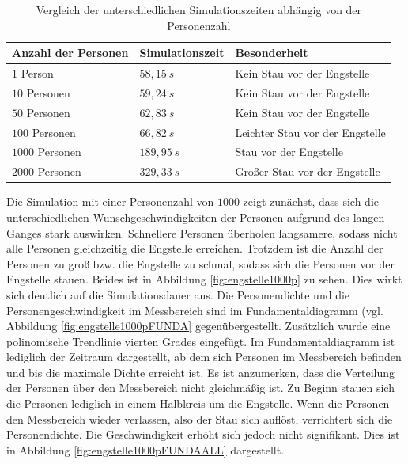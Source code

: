 \begin{table}[htpb]
	\centering
	\begin{tabular}{lll}
		Anzahl der Personen & Simulationszeit  &  Besonderheit\\ \hline
		$1$ Person & $58,15\ s$  &  Kein Stau vor der Engstelle\\ 
		$10$ Personen & $59,24\ s$  &  Kein Stau vor der Engstelle\\ 
		$50$ Personen & $62,83\ s$  &  Kein Stau vor der Engstelle\\ 
		$100$ Personen & $66,82\ s$  &  Leichter Stau vor der Engstelle\\ 
		$1000$ Personen & $189,95\ s$  &  Stau vor der Engstelle\\ 
		$2000$ Personen & $329,33\ s$  &  Großer Stau vor der Engstelle\\ 
 
	\end{tabular}
	\caption{Vergleich der unterschiedlichen Simulationszeiten abhängig von der Personenzahl}
	\label{tab:SimuZeitEngstelle}
\end{table}

Die Simulation mit einer Personenzahl von $1000$ zeigt zunächst, dass sich die unterschiedlichen Wunschgeschwindigkeiten der Personen aufgrund des langen Ganges stark auswirken. Schnellere Personen überholen langsamere, sodass nicht alle Personen gleichzeitig die Engstelle erreichen. Trotzdem ist die Anzahl der Personen zu groß bzw. die Engstelle zu schmal, sodass sich die Personen vor der Engstelle stauen. Beides ist in Abbildung \ref{fig:engstelle1000p} zu sehen. Dies wirkt sich deutlich auf die Simulationsdauer aus. Die Personendichte und die Personengeschwindigkeit im Messbereich sind im Fundamentaldiagramm (vgl. Abbildung \ref{fig:engstelle1000pFUNDA} gegenübergestellt. Zusätzlich wurde eine polinomische Trendlinie vierten Grades eingefügt. Im Fundamentaldiagramm ist lediglich der Zeitraum dargestellt, ab dem sich Personen im Messbereich befinden und bis die maximale Dichte erreicht ist. Es ist anzumerken, dass die Verteilung der Personen über den Messbereich nicht gleichmäßig ist. Zu Beginn stauen sich die Personen lediglich in einem Halbkreis um die Engstelle. Wenn die Personen den Messbereich wieder verlassen, also der Stau sich auflöst, verrichtert sich die Personendichte. Die Geschwindigkeit erhöht sich jedoch nicht signifikant. Dies ist in Abbildung \ref{fig:engstelle1000pFUNDAALL} dargestellt.

